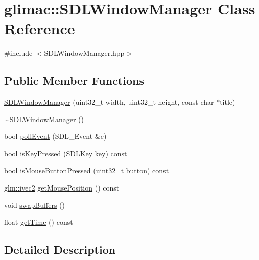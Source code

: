 \hypertarget{classglimac_1_1_s_d_l_window_manager}{}\section{glimac\+:\+:S\+D\+L\+Window\+Manager Class Reference}
\label{classglimac_1_1_s_d_l_window_manager}


{\ttfamily \#include $<$S\+D\+L\+Window\+Manager.\+hpp$>$}

\subsection*{Public Member Functions}
\begin{DoxyCompactItemize}
\item 
\hyperlink{classglimac_1_1_s_d_l_window_manager_aaddb3bc2ec58bc1e818276e81605520f}{S\+D\+L\+Window\+Manager} (uint32\+\_\+t width, uint32\+\_\+t height, const char $\ast$title)
\item 
\hyperlink{classglimac_1_1_s_d_l_window_manager_a135c3b4ec63bf47ce3b39f2485a0026e}{$\sim$\+S\+D\+L\+Window\+Manager} ()
\item 
bool \hyperlink{classglimac_1_1_s_d_l_window_manager_a4b2fd3e74f00c28d3b03e0cff3bb0131}{poll\+Event} (S\+D\+L\+\_\+\+Event \&e)
\item 
bool \hyperlink{classglimac_1_1_s_d_l_window_manager_afa3e15ceca501ac52df29b1906cbb083}{is\+Key\+Pressed} (S\+D\+L\+Key key) const
\item 
bool \hyperlink{classglimac_1_1_s_d_l_window_manager_a3f970279f069c97d64845687f1af5743}{is\+Mouse\+Button\+Pressed} (uint32\+\_\+t button) const
\item 
\hyperlink{group__core__types_ga9e6ce9cfc7919976b318197e18d8a065}{glm\+::ivec2} \hyperlink{classglimac_1_1_s_d_l_window_manager_aac32964a8c7e0e0e790b8fab29ac2831}{get\+Mouse\+Position} () const
\item 
void \hyperlink{classglimac_1_1_s_d_l_window_manager_aee6b4f60e5b418a99d35360aea48bd41}{swap\+Buffers} ()
\item 
float \hyperlink{classglimac_1_1_s_d_l_window_manager_ae79e8321234999083adda1287cf825fe}{get\+Time} () const
\end{DoxyCompactItemize}


\subsection{Detailed Description}


